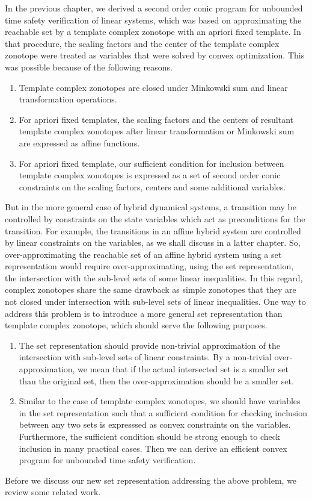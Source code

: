 In the previous chapter, we derived a second order conic program for
unbounded time safety verification of linear systems, which was based
on approximating the reachable set by a template complex zonotope with
an apriori fixed template.  In that procedure, the scaling factors and
the center of the template complex zonotope were treated as variables
that were solved by convex optimization.  This was possible because of
the following reasons.
%
\begin{enumerate}
\item Template complex zonotopes are closed under Minkowski sum and
  linear transformation operations.
\item For apriori fixed templates, the scaling factors and the centers
  of resultant template complex zonotopes after linear transformation
  or Minkowski sum are expressed as affine functions.
\item For apriori fixed template, our sufficient condition for
  inclusion between template complex zonotopes is expressed as a
  set of second order conic constraints on the scaling factors, centers
  and some additional variables.
\end{enumerate}
%
But in the more general case of hybrid dynamical systems, a transition
may be controlled by constraints on the state variables which act as
preconditions for the transition.  For example, the transitions in an
affine hybrid system are controlled by linear constraints on the
variables, as we shall discuss in a latter chapter.  So,
over-approximating the reachable set of an affine hybrid system using
a set representation would require over-approximating, using the set
representation, the intersection with the sub-level sets of some
linear inequalities.  In this regard, complex zonotopes share the same
drawback as simple zonotopes that they are not closed under
intersection with sub-level sets of linear inequalities.  One way to
address this problem is to introduce a more general set representation
than template complex zonotope, which should serve the following
purposes.
%
\begin{enumerate}
\item The set representation should provide non-trivial approximation
  of the intersection with sub-level sets of linear constraints.  By a
  non-trivial over-approximation, we mean that if the actual
  intersected set is a smaller set than the original set, then the
  over-approximation should be a smaller set.
\item Similar to the case of template complex zonotopes, we should
  have variables in the set representation such that a sufficient
  condition for checking inclusion between any two sets is expresssed as
  convex constraints on the variables.  Furthermore, the sufficient
  condition should be strong enough to check inclusion in many
  practical cases.  Then we can derive an efficient convex program for
  unbounded time safety verification.
\end{enumerate}
%
Before we discuss our new set representation addressing the above problem, we review some
related work.


